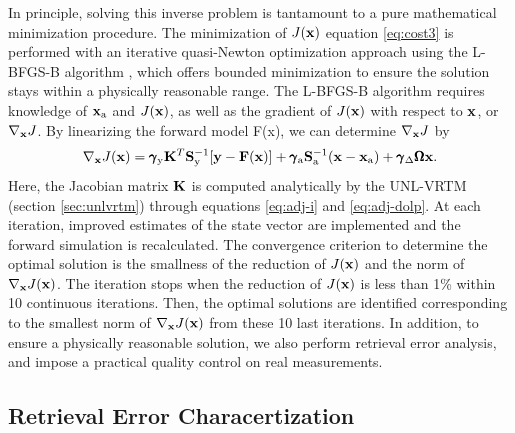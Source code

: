 In principle, solving this inverse problem is tantamount to a pure
mathematical minimization procedure. The minimization of $J(\mathbf{x})$
equation \eqref{eq:cost3}  is performed with an iterative 
quasi-Newton optimization approach using the L-BFGS-B algorithm 
\citep{Byrd95, Zhu94}, which offers bounded minimization to ensure 
the solution stays within a physically reasonable range. 
The L-BFGS-B algorithm requires knowledge of $\mathbf{x}_\text{a}$ and
$J(\mathbf{x})$, as well as the gradient of $J(\mathbf{x})$ with respect to $\mathbf{x}$,
or $\nabla_{\mathbf{x}}J$. By linearizing the forward model F(x), we can 
determine $\nabla_{\mathbf{x}}J$ by 
\begin{equation}
\nabla_{\mathbf{x}}J(\mathbf{x}) = 
   \pmb{\gamma}_\text{y}\mathbf{K}^T\mathbf{S}_\text{y}^{-1}[\mathbf{y}-\mathbf{F}(\mathbf{x})] +
   \pmb{\gamma}_\text{a}\mathbf{S}_\text{a}^{-1}(\mathbf{x}-\mathbf{x}_\text{a}) +
   \pmb{\gamma}_\Delta\pmb{\Omega}\mathbf{x}.
\label{eq:costadj}
\end{equation}
Here, the Jacobian matrix $\mathbf{K}$ is computed analytically by the
UNL-VRTM (section \ref{sec:unlvrtm}) through equations \eqref{eq:adj-i} and 
\eqref{eq:adj-dolp}. At each iteration, improved estimates of the state vector
are implemented and the forward simulation is recalculated. The
convergence criterion to determine the optimal solution is the smallness
of the reduction of $J(\mathbf{x})$ and the norm of $\nabla_{\mathbf{x}}J(\mathbf{x})$. 
The iteration stops when the reduction of $J(\mathbf{x})$ is less than 1\% 
within 10 continuous iterations. Then, the optimal solutions are 
identified corresponding to the smallest norm of $\nabla_{\mathbf{x}}J(\mathbf{x})$ from 
these 10 last iterations. In addition, to ensure a
physically reasonable solution, we also perform retrieval error
analysis, and impose a practical quality control on real measurements. 

\subsection{Retrieval Error Characertization}


